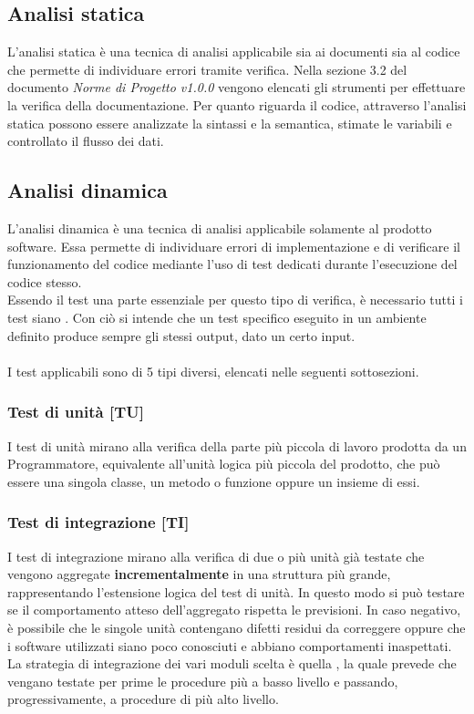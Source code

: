 
\subsection{Analisi statica}
L'analisi statica è una tecnica di analisi applicabile sia ai documenti sia al codice che permette di individuare errori tramite verifica. Nella sezione 3.2 del documento \emph{Norme di Progetto v1.0.0} vengono elencati gli strumenti per effettuare la verifica della documentazione. Per quanto riguarda il codice, attraverso l'analisi statica possono essere analizzate la sintassi e la semantica, stimate le variabili e controllato il flusso dei dati.
\subsection{Analisi dinamica}
L'analisi dinamica è una tecnica di analisi applicabile solamente al prodotto software. Essa permette di individuare errori di implementazione e di verificare il funzionamento del codice mediante l'uso di test dedicati durante l'esecuzione del codice stesso.\\
Essendo il test una parte essenziale per questo tipo di verifica, è necessario tutti i test siano . Con ciò si intende che un test specifico eseguito in un ambiente definito produce sempre gli stessi output, dato un certo input.\\\\
I test applicabili sono di 5 tipi diversi, elencati nelle seguenti sottosezioni.

\subsubsection{Test di unità [TU]}
I test di unità mirano alla verifica della parte più piccola di lavoro prodotta da un Programmatore, equivalente all'unità logica più piccola del prodotto, che può essere una singola classe, un metodo o funzione oppure un insieme di essi.
\subsubsection{Test di integrazione [TI]}
I test di integrazione mirano alla verifica di due o più unità già testate che vengono aggregate \textbf{incrementalmente} in una struttura più grande, rappresentando l’estensione logica del test di unità. In questo modo si può testare se il comportamento atteso dell'aggregato rispetta le previsioni. In caso negativo, è possibile che le singole unità contengano difetti residui da correggere oppure che i software utilizzati siano poco conosciuti e abbiano comportamenti inaspettati.\\
La strategia di integrazione dei vari moduli scelta è quella , la quale prevede che vengano testate per prime le procedure più a basso livello e passando, progressivamente, a procedure di più alto livello. 
